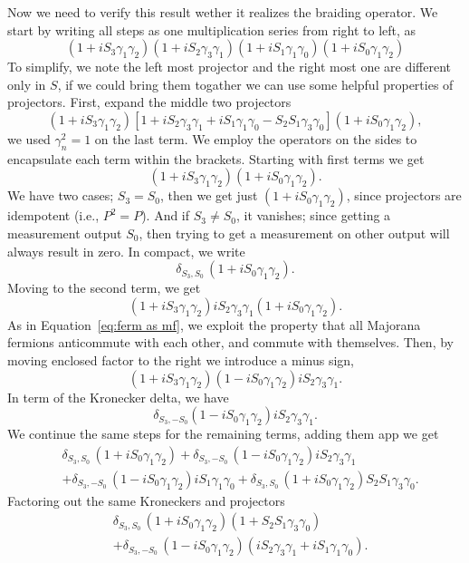 \documentclass{article}
\begin{document}
Now we need to verify this result wether it realizes the braiding operator. We start by writing all steps as one multiplication series from right to left, as
\[
	(1 + iS_3 \gamma_1 \gamma_2) (1 + iS_2 \gamma_3 \gamma_1) (1 + iS_1 \gamma_1 \gamma_0) (1 + iS_0 \gamma_1 \gamma_2)
\]
To simplify, we note the left most projector and the right most one are different only in $ S $, if we could bring them togather we can use some helpful properties of projectors. First, expand the middle two projectors
\[
	(1 + iS_3 \gamma_1 \gamma_2)
	[1 + iS_2 \gamma_3 \gamma_1 + iS_1 \gamma_1 \gamma_0 - S_2 S_1 \gamma_3 \gamma_0]
	(1 + iS_0 \gamma_1 \gamma_2),
\]
we used $ \gamma_n^2 = 1 $ on the last term. We employ the operators on the sides to encapsulate each term within the brackets. Starting with first terms we get
\[
	(1 + iS_3 \gamma_1 \gamma_2) (1 + iS_0 \gamma_1 \gamma_2).
\]
We have two cases; $ S_3 = S_0 $, then we get just $ (1 + iS_0 \gamma_1 \gamma_2) $, since projectors are idempotent (i.e., $ P^2 = P $). And if $ S_3 \ne S_0 $, it vanishes; since getting a measurement output $ S_0 $, then trying to get a measurement on other output will always result in zero. In compact, we write
\[
	\delta_{S_3, S_0} \, (1 + iS_0 \gamma_1 \gamma_2).
\]
Moving to the second term, we get
\[
	(1 + iS_3 \gamma_1 \gamma_2) iS_2 \gamma_3 \gamma_1 (1 + iS_0 \gamma_1 \gamma_2).
\]
As in Equation~\ref{eq:ferm as mf}, we exploit the property that all Majorana fermions anticommute with each other, and commute with themselves. Then, by moving enclosed factor to the right we introduce a minus sign,
\[
	(1 + iS_3 \gamma_1 \gamma_2)(1 - iS_0 \gamma_1 \gamma_2) iS_2 \gamma_3 \gamma_1 .
\]
In term of the Kronecker delta, we have
\[
	\delta_{S_3, -S_0}(1 - iS_0 \gamma_1 \gamma_2)iS_2 \gamma_3 \gamma_1 .
\]
We continue the same steps for the remaining terms, adding them app we get
\[
	\begin{aligned}
		 & \delta_{S_3, S_0} \, (1 + iS_0 \gamma_1 \gamma_2)
		+\delta_{S_3, -S_0}\, (1 - iS_0 \gamma_1 \gamma_2)iS_2 \gamma_3 \gamma_1    \\
		 & +\delta_{S_3, -S_0}\, (1 - iS_0 \gamma_1 \gamma_2)iS_1 \gamma_1 \gamma_0
		+\delta_{S_3, S_0}\, (1 + iS_0 \gamma_1 \gamma_2)S_2 S_1 \gamma_3 \gamma_0 .
	\end{aligned}
\]
Factoring out the same Kroneckers and projectors
\begin{equation}
	\begin{aligned}
		 & \delta_{S_3, S_0} \, (1 + iS_0 \gamma_1 \gamma_2)  ( 1 + S_2 S_1 \gamma_3 \gamma_0 )                    \\
		 & +\delta_{S_3, -S_0} \, (1 - iS_0 \gamma_1 \gamma_2) ( iS_2 \gamma_3 \gamma_1 +iS_1 \gamma_1 \gamma_0) .
	\end{aligned}
	\label{eq:seq 8 mfs}
\end{equation}
\end{document}

